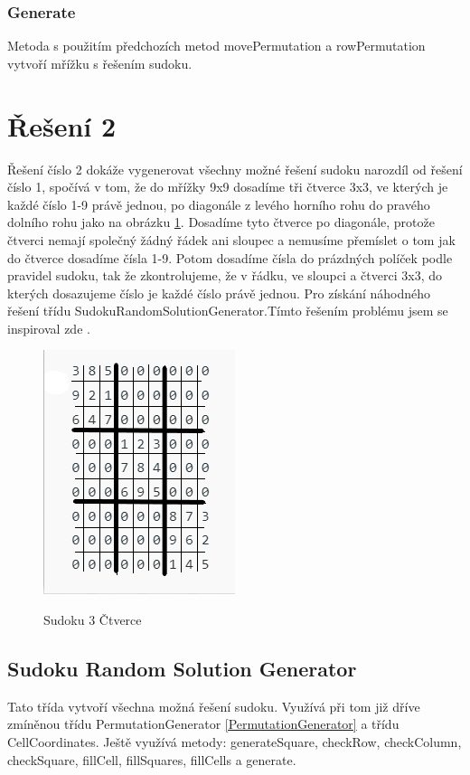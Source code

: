 \subsubsection{Generate}
Metoda s použitím předchozích metod movePermutation a rowPermutation vytvoří mřížku s řešením sudoku.

\section{Řešení 2}
Řešení číslo 2 dokáže vygenerovat všechny možné řešení sudoku narozdíl od řešení číslo 1, spočívá v tom, že do mřížky 9x9 dosadíme tři čtverce 3x3, ve kterých je každé číslo 1-9 právě jednou, po diagonále z levého horního rohu do pravého dolního rohu jako na obrázku \ref{fig:Sudoku3ctverce}. Dosadíme tyto čtverce po diagonále, protože čtverci nemají společný žádný řádek ani sloupec a nemusíme přemíslet o tom jak do čtverce dosadíme čísla 1-9. Potom dosadíme čísla do prázdných políček podle pravidel sudoku, tak že zkontrolujeme, že v řádku, ve sloupci a čtverci 3x3, do kterých dosazujeme číslo je každé číslo právě jednou. Pro získání náhodného řešení třídu SudokuRandomSolutionGenerator.Tímto řešením problému jsem se inspiroval zde \cite{Reseni2}.

\begin{figure}[h!]
    \centering
    \caption{Sudoku 3 Čtverce}
    \includegraphics{images/Sudoku3ctverce1.PNG}
    \label{fig:Sudoku3ctverce}
\end{figure}

\subsection{Sudoku Random Solution Generator}
Tato třída vytvoří všechna možná řešení sudoku. Využívá při tom již dříve zmíněnou třídu PermutationGenerator \ref{PermutationGenerator} a třídu CellCoordinates. Ještě využívá metody: generateSquare, checkRow, checkColumn, checkSquare, fillCell, fillSquares, fillCells a generate.


